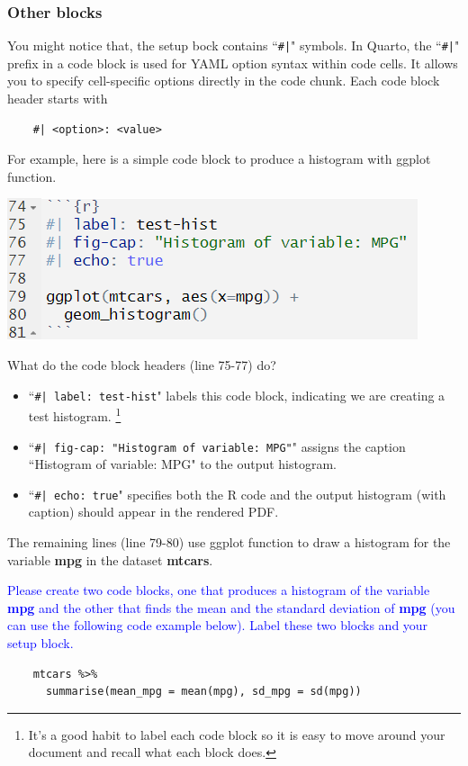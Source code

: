 \documentclass[12pt]{article}
\begin{document}
\subsubsection{Other blocks}
You might notice that, the setup bock contains ``\verb!#|!" symbols. In Quarto, the ``\verb!#|!" prefix in a code block is used for YAML option syntax within code cells. It allows you to specify cell-specific options directly in the code chunk. Each code block header starts with
\begin{verbatim}
    #| <option>: <value>
\end{verbatim}
For example, here is a simple code block to produce a histogram with ggplot function.
\begin{center}
    \includegraphics[scale=.8]{histsample.png}
\end{center}
What do the code block headers (line 75-77) do? 
\begin{itemize}
    \item ``\verb!#| label: test-hist!" labels this code block, indicating we are creating a test histogram. \footnote{It's a good habit to label each code block so it is easy to move around your document and recall what each block does. }
    \item ``\verb!#| fig-cap: "Histogram of variable: MPG"!" assigns the caption ``Histogram of variable: MPG" to the output histogram. 
    \item ``\verb!#| echo: true!" specifies both the R code and the output histogram (with caption) should appear in the rendered PDF.
\end{itemize}
The remaining lines (line 79-80) use ggplot function to draw a histogram for the variable \textbf{mpg} in the dataset \textbf{mtcars}.

\textcolor{blue}{Please create two code blocks, one that produces a histogram of the variable \textbf{mpg} and the other that finds the mean and the standard deviation of \textbf{mpg} (you can use the following code example below). Label these two blocks and your setup block.}
\begin{verbatim}
    mtcars %>%
      summarise(mean_mpg = mean(mpg), sd_mpg = sd(mpg))
\end{verbatim}
\end{document}
